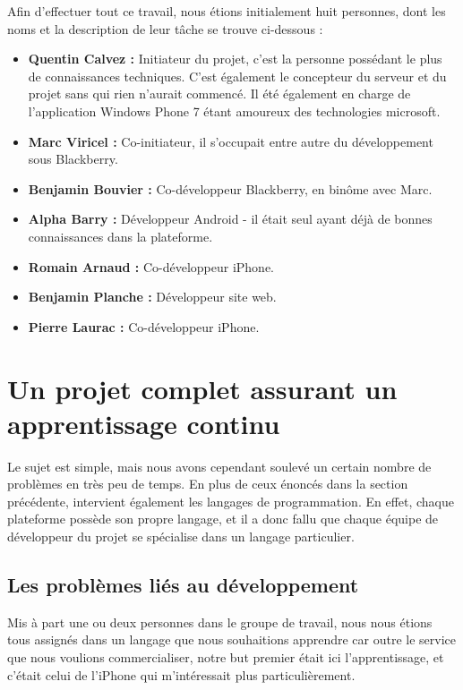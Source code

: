 \documentclass{article}
\begin{document}
Afin d'effectuer tout ce travail, nous étions initialement huit personnes, dont les noms et la description de leur tâche se trouve ci-dessous :
	\begin{itemize}
		\item \textbf{Quentin Calvez :} Initiateur du projet, c'est la personne possédant le plus de connaissances techniques. C'est également le concepteur du serveur et du projet sans qui rien n'aurait commencé. Il été également en charge de l'application Windows Phone 7 étant amoureux des technologies microsoft.
		\item \textbf{Marc Viricel :} Co-initiateur, il s'occupait entre autre du développement sous Blackberry.
		\item \textbf{Benjamin Bouvier :} Co-développeur Blackberry, en binôme avec Marc.
		\item \textbf{Alpha Barry :} Développeur Android - il était seul ayant déjà de bonnes connaissances dans la plateforme.
		\item \textbf{Romain Arnaud :} Co-développeur iPhone.
		\item \textbf{Benjamin Planche :} Développeur site web.
		\item \textbf{Pierre Laurac :} Co-développeur iPhone.
	\end{itemize}

\section{Un projet complet assurant un apprentissage continu}

Le sujet est simple, mais nous avons cependant soulevé un certain nombre de problèmes en très peu de temps. En plus de ceux énoncés dans la section précédente, intervient également les langages de programmation. En effet, chaque plateforme possède son propre langage, et il a donc fallu que chaque équipe de développeur du projet se spécialise dans un langage particulier. \\

\subsection{Les problèmes liés au développement}
Mis à part une ou deux personnes dans le groupe de travail, nous nous étions tous assignés dans un langage que nous souhaitions apprendre car outre le service que nous voulions commercialiser, notre but premier était ici l'apprentissage, et c'était celui de l'iPhone qui m'intéressait plus particulièrement. \\
\end{document}
